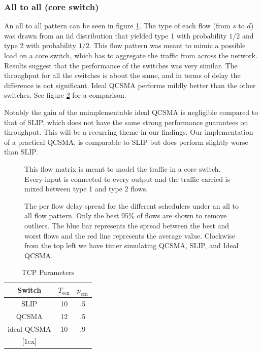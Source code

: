 \documentclass{IEEEtran}%
\begin{document}
\subsubsection{All to all (core switch)}
An all to all pattern can be seen in figure \ref{all_to_all}.  The type of each flow (from $s$ to $d$) was drawn from an iid distribution that yielded type 1 with probability $1/2$ and type 2 with probability $1/2$.  This flow pattern was meant to mimic a possible load on a core switch, which has to aggregate the traffic from across the network.  Results suggest that the performance of the switches was very similar.  The throughput for all the switches is about the same, and in terms of delay the difference is not significant. Ideal QCSMA performs mildly better than the other switches.  See figure \ref{all_to_all_delay} for a comparison.

Notably the gain of the unimplementable ideal QCSMA is negligible compared to that of SLIP, which does not have the same strong performance guarantees on throughput.  This will be a recurring theme in our findings.  Our implementation of a practical QCSMA, is comparable to SLIP but does perform slightly worse than SLIP.

\begin{figure}%
	\caption{This flow matrix is meant to model the traffic in a core switch.  Every input is connected to every output and the traffic carried is mixed between type 1 and type 2 flows.}
	\label{all_to_all}
\end{figure}

\begin{figure}%
	\caption{The per flow delay spread for the different schedulers under an all to all flow pattern.  Only the best 95\% of flows are shown to remove outliers.  The blue bar represents the spread between the best and worst flows and the red line represents the average value.  Clockwise from the top left we have timer simulating QCSMA, SLIP, and Ideal QCSMA.}
	\label{all_to_all_delay}
\end{figure}

\begin{table}[ht] \caption{TCP Parameters} 
\centering 
\begin{tabular}{c c c}
 \hline\hline 
 Switch & $T_{\text{ecn}}$ & $p_{\text{ecn}}$ \\
  [0.5ex] \hline 
 SLIP&10&.5 \\
  QCSMA&12&.5  \\
   ideal  QCSMA&10&.9  \\
  [1ex] \hline 
  \end{tabular}
   \label{ecn_table} 
\end{table}
\end{document}
